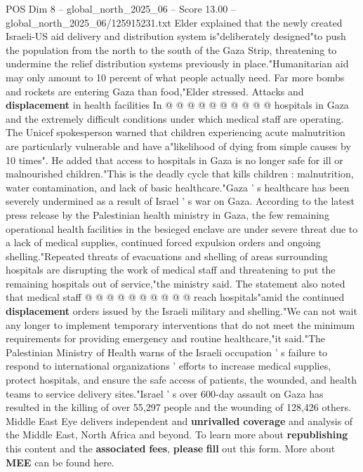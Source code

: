 \begin{textsample}{POS Dim 8 – global\_north\_2025\_06 – Score 13.00 – global\_north\_2025\_06/125915231.txt}
Elder explained that the newly created Israeli-US aid delivery and distribution system is"deliberately designed"to push the population from the north to the south of the Gaza Strip, threatening to undermine the relief distribution systems previously in place."Humanitarian aid may only amount to 10 percent of what people actually need.
Far more bombs and rockets are entering Gaza than food,"Elder stressed.
Attacks and \textbf{displacement} in health facilities In @ @ @ @ @ @ @ @ @ @ hospitals in Gaza and the extremely difficult conditions under which medical staff are operating.
The Unicef spokesperson warned that children experiencing acute malnutrition are particularly vulnerable and have a"likelihood of dying from simple causes by 10 times".
He added that access to hospitals in Gaza is no longer safe for ill or malnourished children."This is the deadly cycle that kills children : malnutrition, water contamination, and lack of basic healthcare."Gaza ' s healthcare has been severely undermined as a result of Israel ' s war on Gaza.
According to the latest press release by the Palestinian health ministry in Gaza, the few remaining operational health facilities in the besieged enclave are under severe threat due to a lack of medical supplies, continued forced expulsion orders and ongoing shelling."Repeated threats of evacuations and shelling of areas surrounding hospitals are disrupting the work of medical staff and threatening to put the remaining hospitals out of service,"the ministry said.
The statement also noted that medical staff @ @ @ @ @ @ @ @ @ @ reach hospitals"amid the continued \textbf{displacement} orders issued by the Israeli military and shelling."We can not wait any longer to implement temporary interventions that do not meet the minimum requirements for providing emergency and routine healthcare,"it said."The Palestinian Ministry of Health warns of the Israeli occupation ' s failure to respond to international organizations ' efforts to increase medical supplies, protect hospitals, and ensure the safe access of patients, the wounded, and health teams to service delivery sites."Israel ' s over 600-day assault on Gaza has resulted in the killing of over 55,297 people and the wounding of 128,426 others.
Middle East Eye delivers independent and \textbf{unrivalled} \textbf{coverage} and analysis of the Middle East, North Africa and beyond.
To learn more about \textbf{republishing} this content and the \textbf{associated} \textbf{fees}, \textbf{please} \textbf{fill} out this form.
More about \textbf{MEE} can be found here.

\end{textsample}
